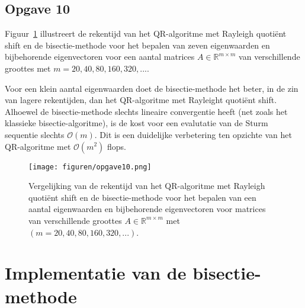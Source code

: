 \documentclass[a4paper, 12pt, titlepage]{report}
\begin{document}
\subsection{Opgave 10}
Figuur~\ref{fig:opgave10} illustreert de rekentijd van het QR-algoritme met Rayleigh quoti\"ent shift en de bisectie-methode voor het bepalen van zeven eigenwaarden en bijbehorende eigenvectoren voor een aantal matrices $A \in \mathbb{R}^{m \times m}$ van verschillende groottes met $m = 20,40,80,160,320,...$. 

Voor een klein aantal eigenwaarden doet de bisectie-methode het beter, in de zin van lagere rekentijden, dan het QR-algoritme met Rayleight quoti\"ent shift. Alhoewel de bisectie-methode slechts lineaire convergentie heeft (net zoals het klassieke bisectie-algoritme), is de kost voor een evalutatie van de Sturm sequentie slechts $\mathcal{O}(m)$. Dit is een duidelijke verbetering ten opzichte van het QR-algoritme met $\mathcal{O}(m^2)$ flops.

\begin{figure}[htb]
	\centering
	\texttt{[image: figuren/opgave10.png]}
	\caption{Vergelijking van de rekentijd van het QR-algoritme met Rayleigh quoti\"ent shift en de bisectie-methode voor het bepalen van een aantal eigenwaarden en bijbehorende eigenvectoren voor matrices van verschillende groottes $A \in \mathbb{R}^{m \times m}$ met $(m = 20,40,80,160,320,...)$.}
	\label{fig:opgave10}
\end{figure}


\newpage

\section{Implementatie van de bisectie-methode}


\end{document}
